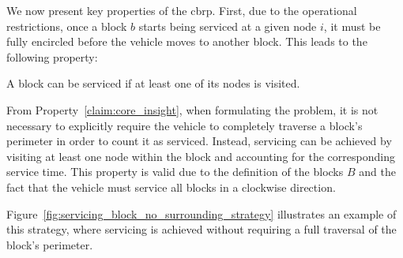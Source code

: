 We now present key properties of the \gls{cbrp}. First, due to the operational
restrictions, once a block $b$ starts being serviced at a given node $i$, it
must be fully encircled before the vehicle moves to another block. This leads
to the following property:

\begin{property}
	\label{claim:core_insight}
	A block can be serviced if at least one of its nodes is visited.
\end{property}

From Property~\ref{claim:core_insight}, 
when formulating the problem, it is not
necessary to explicitly require the vehicle to completely traverse a block's
perimeter in order to count it as serviced. Instead, servicing can be achieved
by visiting at least one node within the block and accounting for the
corresponding service time. This property is valid due to the definition of the blocks $B$ and
the fact that the vehicle must service all blocks in a clockwise direction.

Figure~\ref{fig:servicing_block_no_surrounding_strategy} illustrates an example of
this strategy, where servicing is achieved without requiring a full traversal of
the block's perimeter.

